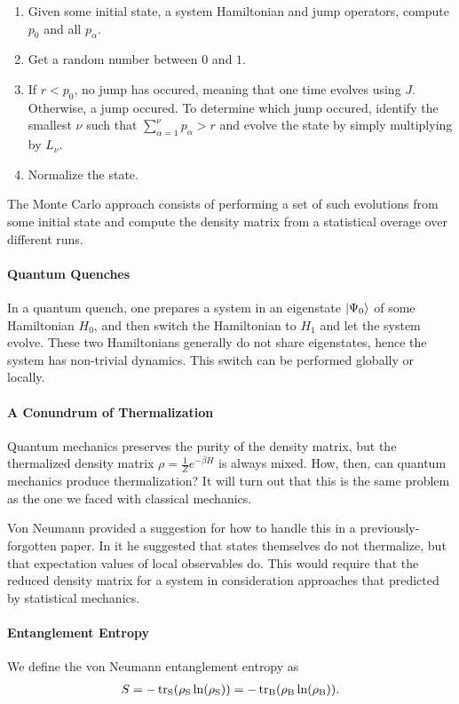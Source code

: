 \begin{enumerate}
	\item Given some initial state, a system Hamiltonian and jump operators, compute $p_{0}$ and all $p_{\alpha}$.
	\item Get a random number between $0$ and $1$.
	\item If $r < p_{0}$, no jump has occured, meaning that one time evolves using $J$. Otherwise, a jump occured. To determine which jump occured, identify the smallest $\nu$ such that $\sum\limits_{\alpha = 1}^{\nu}p_{\alpha}  > r$ and evolve the state by simply multiplying by $L_{\nu}$.
	\item Normalize the state.
\end{enumerate}
The Monte Carlo approach consists of performing a set of such evolutions from some initial state and compute the density matrix from a statistical overage over different runs.

\paragraph{Quantum Quenches}
In a quantum quench, one prepares a system in an eigenstate $\ket{\Psi_{0}}$ of some Hamiltonian $H_{0}$, and then switch the Hamiltonian to $H_{1}$ and let the system evolve. These two Hamiltonians generally do not share eigenstates, hence the system has non-trivial dynamics. This switch can be performed globally or locally.

\paragraph{A Conundrum of Thermalization}
Quantum mechanics preserves the purity of the density matrix, but the thermalized density matrix $\rho = \frac{1}{Z}e^{-\beta H}$ is always mixed. How, then, can quantum mechanics produce thermalization? It will turn out that this is the same problem as the one we faced with classical mechanics.

Von Neumann provided a suggestion for how to handle this in a previously-forgotten paper. In it he suggested that states themselves do not thermalize, but that expectation values of local observables do. This would require that the reduced density matrix for a system in consideration approaches that predicted by statistical mechanics.

\paragraph{Entanglement Entropy}
We define the von Neumann entanglement entropy as
\begin{align*}
	S = -\tr_{\text{S}}(\rho_{\text{S}}\ln(\rho_{\text{S}})) = -\tr_{\text{B}}(\rho_{\text{B}}\ln(\rho_{\text{B}})).
\end{align*}

